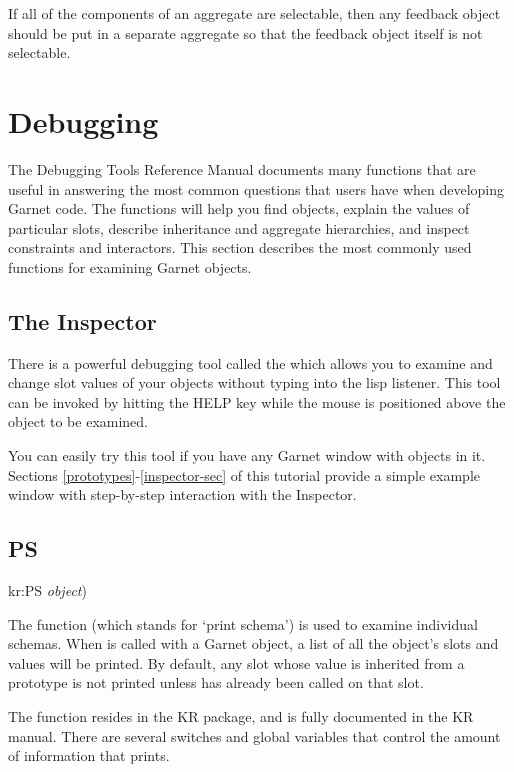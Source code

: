If all of the components of an aggregate are selectable, then any
feedback object should be put in a separate aggregate so that the
feedback object itself is not selectable.


\chapter{Debugging}

The Debugging Tools Reference Manual documents many functions that are
useful in answering the most common questions that users have when
developing Garnet code.  The functions will help you find objects, explain
the values of particular slots, describe inheritance and aggregate
hierarchies, and inspect constraints and interactors.  This section
describes the most commonly used functions for examining Garnet objects.


\section{The Inspector}

There is a powerful debugging tool called the  which allows
you to examine and change slot values of your objects without typing into the
lisp listener.  This tool can be invoked by hitting the HELP key while the
mouse is positioned above the object to be examined.

You can easily try this tool if you have any Garnet window with objects in it.
Sections \ref{prototypes}-\ref{inspector-sec} of this tutorial provide a
simple example window with step-by-step interaction with the Inspector.


\section{PS}

\begin{programexample}
kr:PS {\it object})
\end{programexample}

The function  (which stands for `print schema') is used to examine
individual schemas.  When  is called with a Garnet object, a list
of all the object's slots and values will be printed.  By default, any slot
whose value is inherited from a prototype is not printed unless 
has already been called on that slot.

The  function resides in the KR package, and is fully documented
in the KR manual.  There are several switches and global variables that
control the amount of information that  prints.


